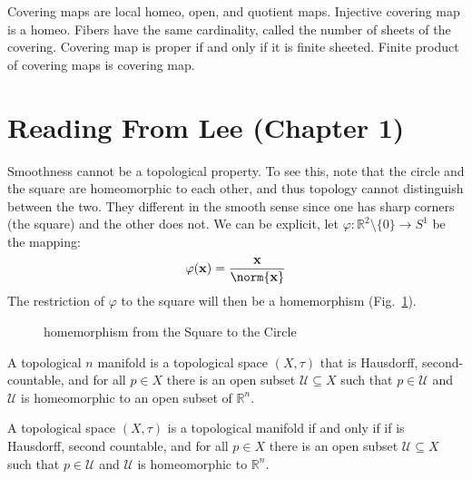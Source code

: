 \documentclass{article}                                                        %
\begin{document}
            Covering maps are local homeo, open, and quotient maps. Injective
            covering map is a homeo. Fibers have the same cardinality, called
            the number of sheets of the covering. Covering map is proper if and
            only if it is finite sheeted. Finite product of covering maps is
            covering map.
    \section{Reading From Lee (Chapter 1)}
        Smoothness cannot be a topological property. To see this, note that the
        circle and the square are homeomorphic to each other, and thus topology
        cannot distinguish between the two. They different in the smooth sense
        since one has sharp corners (the square) and the other does not. We can
        be explicit, let
        $\varphi:\mathbb{R}^{2}\setminus\{0\}\rightarrow{S}^{1}$ be the mapping:
        \begin{equation}
            \varphi(\mathbf{x})=\frac{\mathbf{x}}{\norm{\mathbf{x}}}
        \end{equation}
        The restriction of $\varphi$ to the square will then be a homemorphism
        (Fig.~\ref{fig:Homeomorphism_Square_to_Circle}).
        \begin{figure}[H]
            \centering
            \captionsetup{type=figure}
            
            \caption{homemorphism from the Square to the Circle}
            \label{fig:Homeomorphism_Square_to_Circle}
        \end{figure}
        \begin{definition}
            A topological $n$ manifold is a topological space $(X,\tau)$ that is
            Hausdorff, second-countable, and for all $p\in{X}$ there is an open
            subset $\mathcal{U}\subseteq{X}$ such that $p\in\mathcal{U}$ and
            $\mathcal{U}$ is homeomorphic to an open subset of $\mathbb{R}^{n}$.
        \end{definition}
        \begin{theorem}
            A topological space $(X,\tau)$ is a topological manifold if and only
            if if is Hausdorff, second countable, and for all $p\in{X}$ there is
            an open subset $\mathcal{U}\subseteq{X}$ such that $p\in\mathcal{U}$
            and $\mathcal{U}$ is homeomorphic to $\mathbb{R}^{n}$.
        \end{theorem}
\end{document}
